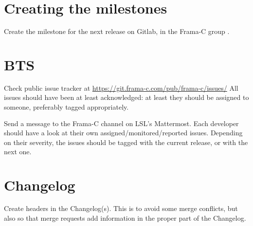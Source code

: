\section{Creating the milestones}

Create the milestone for the next release on \textsf{Gitlab},
in the Frama-C group
.


\section{BTS}

Check public issue tracker at \url{https://git.frama-c.com/pub/frama-c/issues/} All issues should have been at least acknowledged: at least they should be assigned to someone, preferably tagged appropriately.

Send a message to the Frama-C channel on LSL's Mattermost.
Each developer should have a
look at their own assigned/monitored/reported issues. Depending on their severity,
the issues should be tagged with the current release, or with the next one.

\section{Changelog}

Create headers in the Changelog(s). This is to avoid some merge conflicts,
but also so that merge requests add information in the proper part of
the Changelog.

